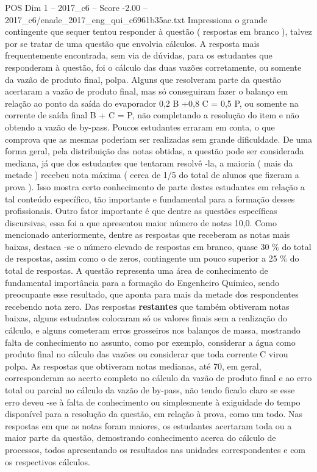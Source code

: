 \begin{textsample}{POS Dim 1 – 2017\_c6 – Score -2.00 – 2017\_c6/enade\_2017\_eng\_qui\_c6961b35ac.txt}
Impressiona o grande contingente que sequer tentou responder à questão ( respostas em branco ), talvez por se tratar de uma questão que envolvia cálculos.
A resposta mais frequentemente encontrada, sem via de dúvidas, para os estudantes que responderam à questão, foi o cálculo das duas vazões corretamente, ou somente da vazão de produto final, polpa.
Alguns que resolveram parte da questão acertaram a vazão de produto final, mas só conseguiram fazer o balanço em relação ao ponto da saída do evaporador 0,2 B +0,8 C = 0,5 P, ou somente na corrente de saída final B + C = P, não completando a resolução do item e não obtendo a vazão de by-pass.
Poucos estudantes erraram em conta, o que comprova que as mesmas poderiam ser realizadas sem grande dificuldade.
De uma forma geral, pela distribuição das notas obtidas, a questão pode ser considerada mediana, já que dos estudantes que tentaram resolvê -la, a maioria ( mais da metade ) recebeu nota máxima ( cerca de 1/5 do total de alunos que fizeram a prova ).
Isso mostra certo conhecimento de parte destes estudantes em relação a tal conteúdo específico, tão importante e fundamental para a formação desses profissionais.
Outro fator importante é que dentre as questões específicas discursivas, essa foi a que apresentou maior número de notas 10,0.
Como mencionado anteriormente, dentre as respostas que receberam as notas mais baixas, destaca -se o número elevado de respostas em branco, quase 30 \% do total de respostas, assim como o de zeros, contingente um pouco superior a 25 \% do total de respostas.
A questão representa uma área de conhecimento de fundamental importância para a formação do Engenheiro Químico, sendo preocupante esse resultado, que aponta para mais da metade dos respondentes recebendo nota zero.
Das respostas \textbf{restantes} que também obtiveram notas baixas, alguns estudantes colocaram só os valores finais sem a realização do cálculo, e alguns cometeram erros grosseiros nos balanços de massa, mostrando falta de conhecimento no assunto, como por exemplo, considerar a água como produto final no cálculo das vazões ou considerar que toda corrente C virou polpa.
As respostas que obtiveram notas medianas, até 70, em geral, corresponderam ao acerto completo no cálculo da vazão de produto final e ao erro total ou parcial no cálculo da vazão de by-pass, não tendo ficado claro se esse erro deveu -se à falta de conhecimento ou simplesmente à exiguidade do tempo disponível para a resolução da questão, em relação à prova, como um todo.
Nas respostas em que as notas foram maiores, os estudantes acertaram toda ou a maior parte da questão, demostrando conhecimento acerca do cálculo de processos, todos apresentando os resultados nas unidades correspondentes e com os respectivos cálculos.

\end{textsample}
